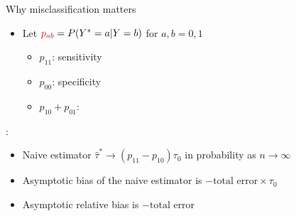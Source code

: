 \documentclass[12pt,aspectratio=169]{beamer}
\begin{document}
\begin{frame}{Why misclassification matters}
\begin{itemize}
\item
Let ${\color{cred}p_{ab}}=P(Y^\ast=a|Y=b)$ for $a, b=0, 1$
 
\begin{itemize}
\item $p_{11}$: sensitivity
\item $p_{00}$: specificity
\item $p_{10}+p_{01}$: 
\end{itemize}

\end{itemize}

\begin{block}
:
{\it

\begin{itemize}

\item  Naive estimator {\color{cred}$\hat\tau^\ast\rightarrow (p_{11}-p_{10}) \tau_0$} in probability as $n\rightarrow  \infty$

\item Asymptotic  {\color{cred} bias} of the naive estimator {\color{cred}is
$
-\text{total error}\times \tau_0
$}

\item Asymptotic  {\color{cred}relative bias  is
$
-\text{total error}
$
}

\end{itemize}
}
\end{block}

 \vfill
{\color{black!40}{\scriptsize Shu D, Yi GY. Causal inference with measurement error in outcomes: bias analysis and estimation methods. Stat Methods Med Res 2019;28(7):2049-68.}}
\end{frame}
\end{document}
